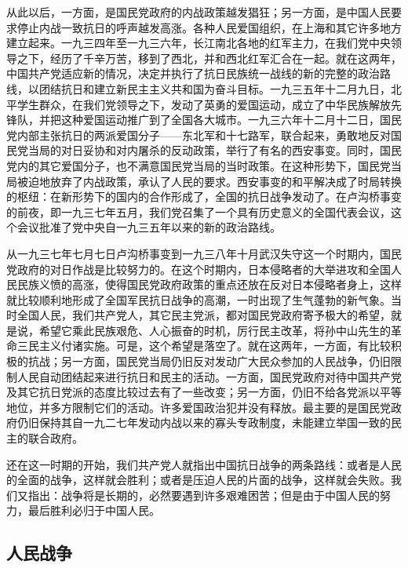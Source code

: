 从此以后，一方面，是国民党政府的内战政策越发猖狂；另一方面，是中国人民要求停止内战一致抗日的呼声越发高涨。各种人民爱国组织，在上海和其它许多地方建立起来。一九三四年至一九三六年，长江南北各地的红军主力，在我们党中央领导之下，经历了千辛万苦，移到了西北，并和西北红军汇合在一起。就在这两年，中国共产党适应新的情况，决定并执行了抗日民族统一战线的新的完整的政治路线，以团结抗日和建立新民主主义共和国为奋斗目标。一九三五年十二月九日，北平学生群众，在我们党领导之下，发动了英勇的爱国运动，成立了中华民族解放先锋队，并把这种爱国运动推广到了全国各大城市。一九三六年十二月十二日，国民党内部主张抗日的两派爱国分子——东北军和十七路军，联合起来，勇敢地反对国民党当局的对日妥协和对内屠杀的反动政策，举行了有名的西安事变。同时，国民党内的其它爱国分子，也不满意国民党当局的当时政策。在这种形势下，国民党当局被迫地放弃了内战政策，承认了人民的要求。西安事变的和平解决成了时局转换的枢纽：在新形势下的国内的合作形成了，全国的抗日战争发动了。在卢沟桥事变的前夜，即一九三七年五月，我们党召集了一个具有历史意义的全国代表会议，这个会议批准了党中央自一九三五年以来的新的政治路线。

从一九三七年七月七日卢沟桥事变到一九三八年十月武汉失守这一个时期内，国民党政府的对日作战是比较努力的。在这个时期内，日本侵略者的大举进攻和全国人民民族义愤的高涨，使得国民党政府政策的重点还放在反对日本侵略者身上，这样就比较顺利地形成了全国军民抗日战争的高潮，一时出现了生气蓬勃的新气象。当时全国人民，我们共产党人，其它民主党派，都对国民党政府寄予极大的希望，就是说，希望它乘此民族艰危、人心振奋的时机，厉行民主改革，将孙中山先生的革命三民主义付诸实施。可是，这个希望是落空了。就在这两年，一方面，有比较积极的抗战；另一方面，国民党当局仍旧反对发动广大民众参加的人民战争，仍旧限制人民自动团结起来进行抗日和民主的活动。一方面，国民党政府对待中国共产党及其它抗日党派的态度比较过去有了一些改变；另一方面，仍旧不给各党派以平等地位，并多方限制它们的活动。许多爱国政治犯并没有释放。最主要的是国民党政府仍旧保持其自一九二七年发动内战以来的寡头专政制度，未能建立举国一致的民主的联合政府。

还在这一时期的开始，我们共产党人就指出中国抗日战争的两条路线：或者是人民的全面的战争，这样就会胜利；或者是压迫人民的片面的战争，这样就会失败。我们又指出：战争将是长期的，必然要遇到许多艰难困苦；但是由于中国人民的努力，最后胜利必归于中国人民。

\subsection{人民战争}

